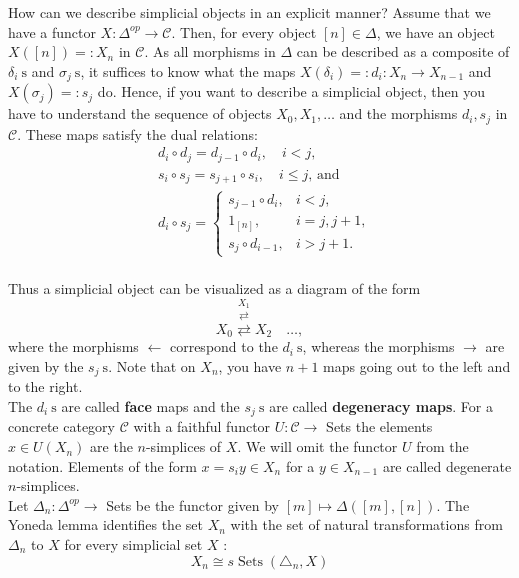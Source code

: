 How can we describe simplicial objects in an explicit manner? Assume that we have a functor $X: \Delta^{o p} \rightarrow \mathcal{C}$. Then, for every object $[n] \in \Delta$, we have an object $X([n])=: X_n$ in $\mathcal{C}$. As all morphisms in $\Delta$ can be described as a composite of $\delta_i \mathrm{~s}$ and $\sigma_j \mathrm{~s}$, it suffices to know what the maps $X\left(\delta_i\right)=: d_i: X_n \rightarrow X_{n-1}$ and $X\left(\sigma_j\right)=: s_j$ do. Hence, if you want to describe a simplicial object, then you have to understand the sequence of objects $X_0, X_1, \ldots$ and the morphisms $d_i, s_j$ in $\mathcal{C}$. These maps satisfy the dual relations:
$$
\begin{aligned}
& d_i \circ d_j=d_{j-1} \circ d_i, \quad i<j, \\
& s_i \circ s_j=s_{j+1} \circ s_i, \quad i \leq j \text {, and } \\
& d_i \circ s_j=\left\{\begin{array}{cl}
s_{j-1} \circ d_i, & i<j, \\
1_{[n]}, & i=j, j+1, \\
s_j \circ d_{i-1}, & i>j+1 .
\end{array}\right. \\
&
\end{aligned}
$$

Thus a simplicial object can be visualized as a diagram of the form
$$
X_0 \stackrel{X_1}{\stackrel{\rightleftarrows}{\rightleftarrows}} X_2 \quad \ldots,
$$
where the morphisms $\leftarrow$ correspond to the $d_i \mathrm{~s}$, whereas the morphisms $\rightarrow$ are given by the $s_j \mathrm{~s}$. Note that on $X_n$, you have $n+1$ maps going out to the left and to the right.\\
The $d_i \mathrm{~s}$ are called \textbf{face} maps and the $s_j \mathrm{~s}$ are called \textbf{degeneracy maps}.
For a concrete category $\mathcal{C}$ with a faithful functor $U: \mathcal{C} \rightarrow$ Sets the elements $x \in U\left(X_n\right)$ are the $n$-simplices of $X$. We will omit the functor $U$ from the notation. Elements of the form $x=s_i y \in X_n$ for a $y \in X_{n-1}$ are called degenerate $n$-simplices.\\

Let $\Delta_n: \Delta^{o p} \rightarrow$ Sets be the functor given by $[m] \mapsto \Delta([m],[n])$.
The Yoneda lemma identifies the set $X_n$ with the set of natural transformations from $\Delta_n$ to $X$ for every simplicial set $X$ :
$$
X_n \cong s \operatorname{Sets}\left(\triangle_n, X\right)
$$

